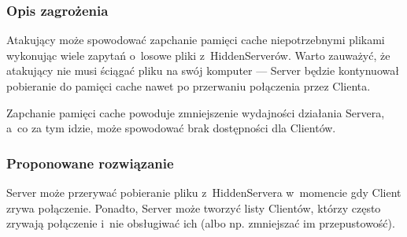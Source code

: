 \documentclass[a4paper,notitlepage]{article}
\begin{document}
\subsubsection*{Opis zagrożenia}
Atakujący może spowodować zapchanie pamięci cache niepotrzebnymi plikami
wykonując wiele zapytań o~losowe pliki z~HiddenServerów. Warto zauważyć,
że atakujący nie musi ściągać pliku na swój komputer --- Server będzie
kontynuował pobieranie do pamięci cache nawet po przerwaniu połączenia
przez Clienta.

Zapchanie pamięci cache powoduje zmniejszenie wydajności działania Servera,
a~co za tym idzie, może spowodować brak dostępności dla Clientów.

\subsubsection*{Proponowane rozwiązanie}
Server może przerywać pobieranie pliku z~HiddenServera w~momencie gdy
Client zrywa połączenie. Ponadto, Server może tworzyć listy Clientów,
którzy często zrywają połączenie i~nie obsługiwać ich (albo np. zmniejszać
im przepustowość).
\end{document}
